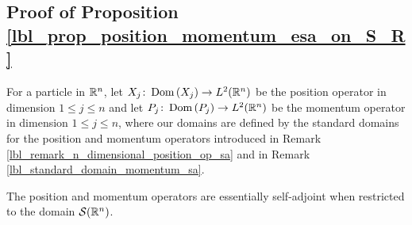 \subsection{Proof of Proposition \eqref{lbl_prop_position_momentum_esa_on_S_R}}\label{proof_lbl_prop_position_momentum_esa_on_S_R}

\begin{proposition}
  For a particle in $\mathbb{R}^n$, let $X_j \colon \operatorname{Dom}\left(X_j\right) \to L^2(\mathbb{R}^n)$ be the position operator in dimension $1 \leq j \leq n$ and let $P_j \colon \operatorname{Dom}\left(P_j\right) \to L^2(\mathbb{R}^n)$ be the momentum operator in dimension $1 \leq j \leq n$, where our domains are defined by the standard domains for the position and momentum operators introduced in Remark \eqref{lbl_remark_n_dimensional_position_op_sa} and in Remark \eqref{lbl_standard_domain_momentum_sa}.

  \medskip

  The position and momentum operators are essentially self-adjoint when restricted to the domain $\mathcal{S}(\mathbb{R}^n)$.
\end{proposition}

